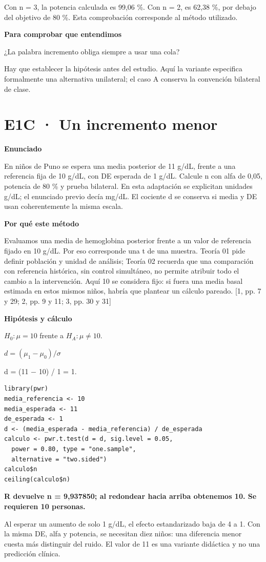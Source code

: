 \documentclass[10pt,a4paper]{article}
\newcommand{\etiqueta}[1]{\par{\bfseries\color{Blue}#1}\par}
\newcommand{\cajares}[1]{\par\colorbox{Pale}{\parbox{\dimexpr\linewidth-2\fboxsep}{\vspace{4pt}\textbf{\color{Navy}#1}\vspace{4pt}}}\par}
\begin{document}
{\small\color{Gray}Con n = 3, la potencia calculada es 99,06 \%. Con n = 2, es 62,38 \%, por debajo del objetivo de 80 \%. Esta comprobación corresponde al método utilizado.}
\etiqueta{Para comprobar que entendimos}
¿La palabra incremento obliga siempre a usar una cola?

{\small Hay que establecer la hipótesis antes del estudio. Aquí la variante especifica formalmente una alternativa unilateral; el caso A conserva la convención bilateral de clase.}
\clearpage
\section*{E1C · Un incremento menor}
\etiqueta{Enunciado}
En niños de Puno se espera una media posterior de 11 g/dL, frente a una referencia fija de 10 g/dL, con DE esperada de 1 g/dL. Calcule n con alfa de 0,05, potencia de 80 \% y prueba bilateral. En esta adaptación se explicitan unidades g/dL; el enunciado previo decía mg/dL. El cociente d se conserva si media y DE usan coherentemente la misma escala.
\etiqueta{Por qué este método}
Evaluamos una media de hemoglobina posterior frente a un valor de referencia fijado en 10 g/dL. Por eso corresponde una t de una muestra. Teoría 01 pide definir población y unidad de análisis; Teoría 02 recuerda que una comparación con referencia histórica, sin control simultáneo, no permite atribuir todo el cambio a la intervención. Aquí 10 se considera fijo: si fuera una media basal estimada en estos mismos niños, habría que plantear un cálculo pareado. [1, pp. 7 y 29; 2, pp. 9 y 11; 3, pp. 30 y 31]
\etiqueta{Hipótesis y cálculo}
$H_0: \mu=10$ frente a $H_A: \mu\ne10$.

$d=(\mu_1-\mu_0)/\sigma$

d = (11 \ensuremath{-} 10) / 1 = 1.
\begin{Verbatim}
library(pwr)
media_referencia <- 10
media_esperada <- 11
de_esperada <- 1
d <- (media_esperada - media_referencia) / de_esperada
calculo <- pwr.t.test(d = d, sig.level = 0.05,
  power = 0.80, type = "one.sample",
  alternative = "two.sided")
calculo$n
ceiling(calculo$n)
\end{Verbatim}
\cajares{R devuelve n = 9,937850; al redondear hacia arriba obtenemos 10. Se requieren 10 personas.}
Al esperar un aumento de solo 1 g/dL, el efecto estandarizado baja de 4 a 1. Con la misma DE, alfa y potencia, se necesitan diez niños: una diferencia menor cuesta más distinguir del ruido. El valor de 11 es una variante didáctica y no una predicción clínica.
\end{document}
